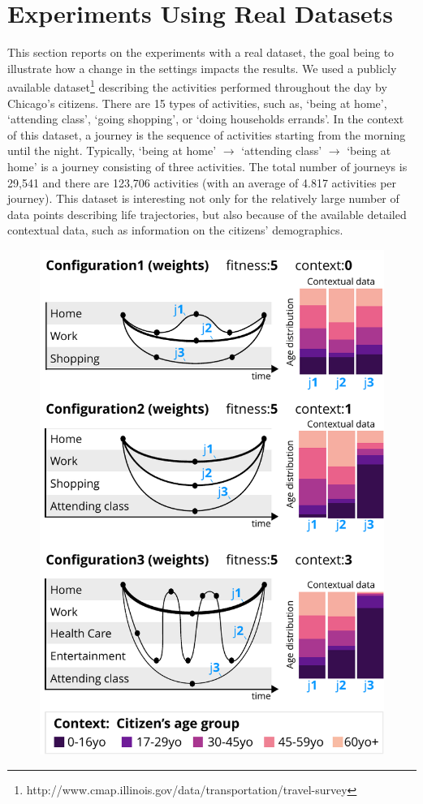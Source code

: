 \documentclass[runningheads]{llncs}
\begin{document}
{{{\section{Experiments Using Real Datasets}

This section reports on the experiments with a real dataset, the goal being to illustrate how a change in the settings impacts the results.  We used a publicly available dataset\footnote{http://www.cmap.illinois.gov/data/transportation/travel-survey
} describing the activities performed throughout the day by Chicago's citizens. There are 15 types of activities, such as, `being at home', `attending class', `going shopping', or `doing households errands'. In the context of this dataset, a journey is the sequence of activities starting from the morning until the night. Typically, `being at home' $\rightarrow$ `attending class' $\rightarrow$ `being at home' is a journey consisting of three activities. The total number of journeys is 29,541 and there are 123,706 activities (with an average of 4.817 activities per journey). This dataset is interesting not only for the relatively large number of data points describing life trajectories, but also because of the available detailed contextual data, such as information on the citizens' demographics. 


\begin{figure}[H]
  \begin{center}
    
	\includegraphics[width=0.6\columnwidth]{05_schema/results_real_dataset.pdf}
    

\end{center}
\end{figure}}}}
\end{document}
